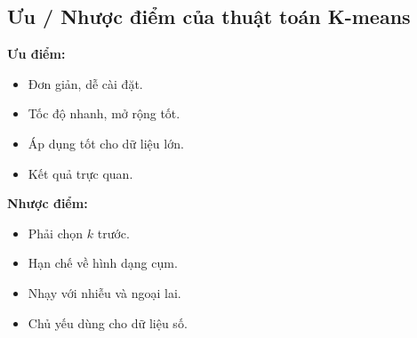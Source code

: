 \subsection{Ưu / Nhược điểm của thuật toán K-means}
\textbf{Ưu điểm:}
\begin{itemize}
    \item Đơn giản, dễ cài đặt.
    \item Tốc độ nhanh, mở rộng tốt.
    \item Áp dụng tốt cho dữ liệu lớn.
    \item Kết quả trực quan.
\end{itemize}

\textbf{Nhược điểm:}
\begin{itemize}
    \item Phải chọn $k$ trước.
    \item Hạn chế về hình dạng cụm.
    \item Nhạy với nhiễu và ngoại lai.
    \item Chủ yếu dùng cho dữ liệu số.
\end{itemize}